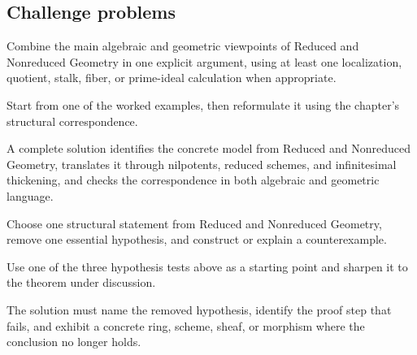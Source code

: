 \subsection*{Challenge problems}

\begin{exercise}\label{exr:vi10-expand-15}
Combine the main algebraic and geometric viewpoints of Reduced and Nonreduced Geometry in one explicit argument, using at least one localization, quotient, stalk, fiber, or prime-ideal calculation when appropriate.
\end{exercise}
\begin{hint}
Start from one of the worked examples, then reformulate it using the chapter's structural correspondence.
\end{hint}
\begin{solution}
A complete solution identifies the concrete model from Reduced and Nonreduced Geometry, translates it through nilpotents, reduced schemes, and infinitesimal thickening, and checks the correspondence in both algebraic and geometric language.
\end{solution}

\begin{exercise}\label{exr:vi10-expand-16}
Choose one structural statement from Reduced and Nonreduced Geometry, remove one essential hypothesis, and construct or explain a counterexample.
\end{exercise}
\begin{hint}
Use one of the three hypothesis tests above as a starting point and sharpen it to the theorem under discussion.
\end{hint}
\begin{solution}
The solution must name the removed hypothesis, identify the proof step that fails, and exhibit a concrete ring, scheme, sheaf, or morphism where the conclusion no longer holds.
\end{solution}

